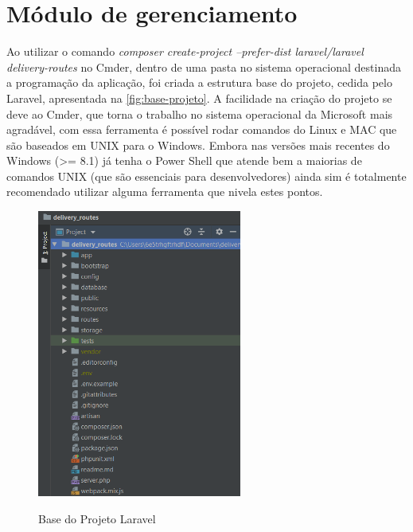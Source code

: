 \section{Módulo de gerenciamento}
Ao utilizar o comando \textit{composer create-project --prefer-dist laravel/laravel delivery-routes} no Cmder, dentro de uma pasta no sistema operacional destinada a programação da aplicação, foi criada a estrutura base do projeto, cedida pelo Laravel, apresentada na \autoref{fig:base-projeto}. A facilidade na criação do projeto se deve ao Cmder, que torna o trabalho no sistema operacional da Microsoft mais agradável, com essa ferramenta é possível rodar comandos do Linux e MAC que são baseados em UNIX para o Windows. Embora nas versões mais recentes do Windows (>= 8.1) já tenha o Power Shell que atende bem a maiorias de comandos UNIX (que são essenciais para desenvolvedores) ainda sim é totalmente recomendado utilizar alguma ferramenta que nivela estes pontos.

\begin{figure}[H]
    \centering
    \caption{Base do Projeto Laravel}
    \includegraphics[width=0.6\textwidth]{./dados/figuras/fig6}
    \label{fig:base-projeto}
\end{figure}

